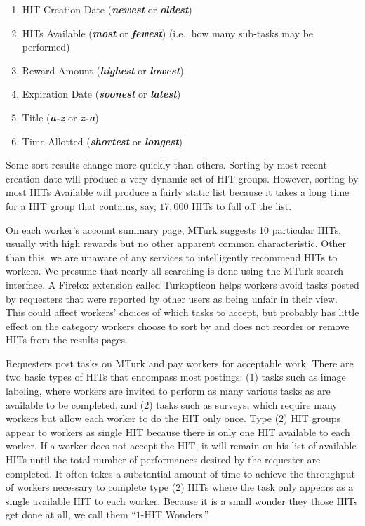 \documentclass{sig-alternate}
\begin{document}
\begin{enumerate}
\item HIT Creation Date ({\bfseries {\em newest}} or {\bfseries {\em oldest}})
\item HITs Available ({\bfseries {\em most}} or {\bfseries {\em fewest}}) (i.e., how many sub-tasks may be performed)
\item Reward Amount ({\bfseries {\em highest}} or {\bfseries {\em lowest}})
\item Expiration Date ({\bfseries {\em soonest}} or {\bfseries {\em latest}})
\item Title ({\bfseries {\em a-z}} or {\bfseries {\em z-a}})
\item Time Allotted ({\bfseries {\em shortest}} or {\bfseries {\em longest}})
\end{enumerate}

Some sort results change more quickly than others.  Sorting by most
recent creation date will produce a very dynamic set of HIT groups.
However, sorting by most HITs Available will produce a fairly
static list because it takes a long time for a HIT group that contains, say, $17,000$ HITs to fall off the list.

On each worker's account summary page, MTurk suggests 10 particular HITs, usually
with high rewards but no other apparent common characteristic.  Other
than this, we are unaware of any services to intelligently recommend
HITs to workers.  We presume that nearly all searching is done using
the MTurk search interface.   A Firefox extension called Turkopticon \cite{silberman2010sellers} helps workers avoid tasks posted by requesters that were reported by other users as being unfair in their view.  This could affect workers' choices of which tasks to accept, but probably has little effect on the category workers choose to sort by and does not reorder or remove HITs from the results pages.  

Requesters post tasks on MTurk and pay workers
for acceptable work.  There are two basic types of HITs that encompass most postings: ($1$) tasks such
as image labeling, where workers are invited to perform as many various tasks as are available to be completed, and ($2$) tasks such as surveys, which require many workers but allow each worker to do the HIT only once.  Type ($2$) HIT groups appear to workers as single HIT because there is only one HIT available to each worker.  If a worker does not accept the HIT, it will remain on his list
of available HITs until the total number of performances desired by the requester are completed.  It often takes a substantial amount of time to achieve the throughput of workers necessary to
complete type ($2$) HITs where the task only appears as a single available HIT to each worker.  Because it is a small wonder they those HITs get done at all, we call them ``$1$-HIT Wonders.''
\end{document}
